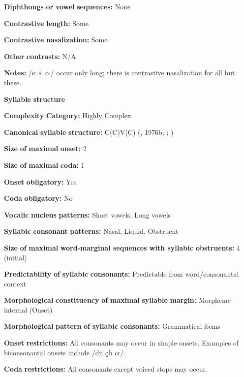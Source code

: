 \textbf{Diphthongs} \textbf{or} \textbf{vowel} \textbf{sequences:} None

\textbf{Contrastive} \textbf{length:} Some

\textbf{Contrastive} \textbf{nasalization:} Some

\textbf{Other} \textbf{contrasts:} N/A

\textbf{Notes:} /eː ɨː oː/ occur only long; there is contrastive nasalization for all but these.

\textbf{Syllable} \textbf{structure}

\textbf{Complexity} \textbf{Category:} Highly Complex 

\textbf{Canonical} \textbf{syllable} \textbf{structure:} C(C)V(C) (\citealt{Diffloth1976a}, 1976b; \citealt{Sloan1988}; \citealt{Philips2007})

\textbf{Size} \textbf{of} \textbf{maximal} \textbf{onset:} 2

\textbf{Size} \textbf{of} \textbf{maximal} \textbf{coda:} 1

\textbf{Onset} \textbf{obligatory:} Yes

\textbf{Coda} \textbf{obligatory:} No

\textbf{Vocalic} \textbf{nucleus} \textbf{patterns:} Short vowels, Long vowels

\textbf{Syllabic} \textbf{consonant} \textbf{patterns:} Nasal, Liquid, Obstruent

\textbf{Size} \textbf{of} \textbf{maximal} \textbf{word{}-marginal sequences with syllabic obstruents:} 4 (initial)

\textbf{Predictability} \textbf{of} \textbf{syllabic} \textbf{consonants:} Predictable from word/consonantal context

\textbf{Morphological} \textbf{constituency} \textbf{of} \textbf{maximal} \textbf{syllable} \textbf{margin:} Morpheme-internal (Onset)

\textbf{Morphological} \textbf{pattern} \textbf{of} \textbf{syllabic} \textbf{consonants:} Grammatical items

\textbf{Onset} \textbf{restrictions:} All consonants may occur in simple onsets. Examples of biconsonantal onsets include /dn ɡh cɾ/.

\textbf{Coda} \textbf{restrictions:} All consonants except voiced stops may occur.


